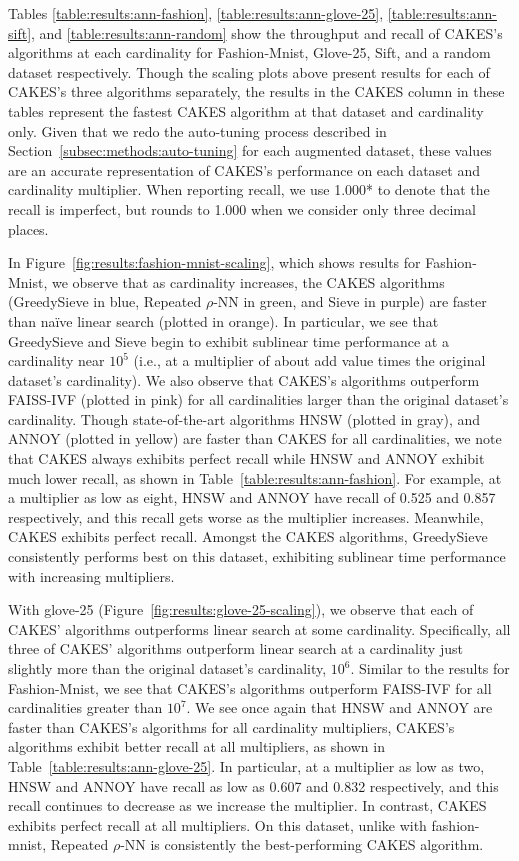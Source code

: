 Tables \ref{table:results:ann-fashion}, \ref{table:results:ann-glove-25}, \ref{table:results:ann-sift}, and \ref{table:results:ann-random} show the throughput and recall of CAKES's algorithms at each cardinality for  Fashion-Mnist, Glove-25, Sift, and a random dataset respectively. Though the scaling plots above present results for each of CAKES's three algorithms separately, the results in the CAKES column in these tables represent the fastest CAKES algorithm at that dataset and cardinality only. 
Given that we redo the auto-tuning process described in Section~\ref{subsec:methods:auto-tuning} for each augmented dataset, these values are an accurate representation of CAKES's performance on each dataset and cardinality multiplier. 
When reporting recall, we use 1.000* to denote that the recall is imperfect, but rounds to 1.000 when we consider only three decimal places.

In Figure~\ref{fig:results:fashion-mnist-scaling}, which shows results for Fashion-Mnist, we observe that as cardinality increases, the CAKES algorithms (GreedySieve in blue, Repeated $\rho$-NN in green, and Sieve in purple) are faster than na\"{i}ve linear search (plotted in orange).
In particular, we see that GreedySieve and Sieve begin to exhibit sublinear time performance at a cardinality near $10^5$ (i.e., at a multiplier of about {\color{red} add value} times the original dataset's cardinality). 
We also observe that CAKES's algorithms outperform FAISS-IVF (plotted in pink) for all cardinalities larger than the original dataset's cardinality.
Though state-of-the-art algorithms HNSW (plotted in gray), and ANNOY (plotted in yellow) are faster than CAKES for all cardinalities, we note that CAKES always exhibits perfect recall while HNSW and ANNOY exhibit much lower recall, as shown in Table~\ref{table:results:ann-fashion}.
For example, at a multiplier as low as eight, HNSW and ANNOY have recall of 0.525 and 0.857 respectively,
and this recall gets worse as the multiplier increases.
Meanwhile, CAKES exhibits perfect recall.
Amongst the CAKES algorithms, GreedySieve consistently performs best on this dataset, exhibiting sublinear time performance with increasing multipliers.


With glove-25 (Figure~\ref{fig:results:glove-25-scaling}), we observe that each of CAKES' algorithms outperforms linear search at some cardinality.
Specifically, all three of CAKES' algorithms outperform linear search at a cardinality just slightly more than the original dataset's cardinality, $10^6$.
Similar to the results for Fashion-Mnist, we see that CAKES's algorithms outperform FAISS-IVF for all cardinalities greater than $10^7$.
We see once again that HNSW and ANNOY are faster than CAKES's algorithms for all cardinality multipliers, CAKES's algorithms exhibit better recall at all multipliers, as shown in Table~\ref{table:results:ann-glove-25}.
In particular, at a multiplier as low as two, HNSW and ANNOY have recall as low as 0.607 and 0.832 respectively, and this recall continues to decrease as we increase the multiplier.
In contrast, CAKES exhibits perfect recall at all multipliers.
On this dataset, unlike with fashion-mnist, Repeated $\rho$-NN is consistently the best-performing CAKES algorithm. 


